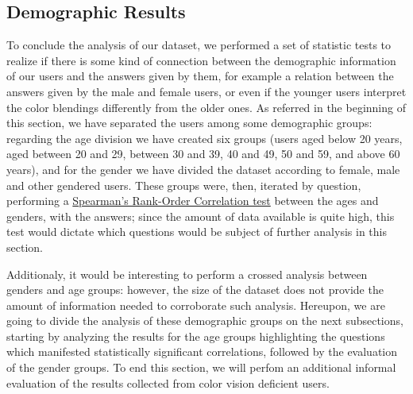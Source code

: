 \subsection{Demographic Results}
\label{subsec:results_demographic}
%
To conclude the analysis of our dataset, we performed a set of statistic tests to realize if there is some kind of connection between the demographic information of our users and the answers given by them, for example a relation between the answers given by
the male and female users, or even if the younger users interpret the color blendings differently from the older ones. As referred in the beginning of this section, we have separated the users among some demographic groups: regarding the age division we have
created six groups (users aged below 20 years, aged between 20 and 29, between 30 and 39, 40 and 49, 50 and 59, and above 60 years), and for the gender we have divided the dataset according to female, male and other gendered users. These groups were, then, iterated
by question, performing a \ul{Spearman's Rank-Order Correlation test} between the ages and genders, with the answers; since the amount of data available is quite high, this test would dictate which questions would be subject of further analysis in this section. \par
%
Additionaly, it would be interesting to perform a crossed analysis between genders and age groups: however, the size of the dataset does not provide the amount of information needed to corroborate such analysis. Hereupon, we are going to divide the analysis of these demographic
groups on the next subsections, starting by analyzing the results for the age groups highlighting the questions which manifested statistically significant correlations, followed by the evaluation of the gender groups. To end this section, we will perfom an additional
informal evaluation of the results collected from color vision deficient users.
%
